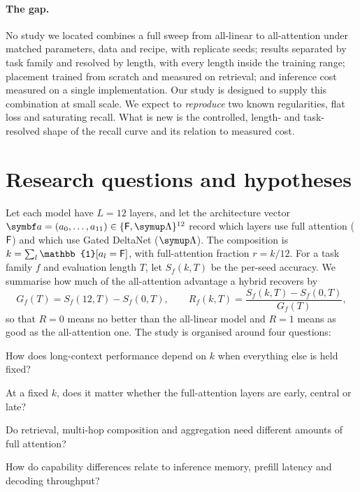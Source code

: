 \documentclass[10pt,a4paper]{article}
\begin{document}
\paragraph{The gap.}
No study we located combines a full sweep from all-linear to all-attention under matched parameters,
data and recipe, with replicate seeds; results separated by task family and resolved by length, with
every length inside the training range; placement trained from scratch and measured on retrieval;
and inference cost measured on a single implementation. Our study is designed to supply this
combination at small scale. We expect to \emph{reproduce} two known regularities, flat loss and
saturating recall. What is new is the controlled, length- and task-resolved shape of the recall
curve and its relation to measured cost.

\section{Research questions and hypotheses}\label{sec:rq}

Let each model have $L=12$ layers, and let the architecture vector
$\vect{a}=(a_0,\dots,a_{11})\in\{\Full,\Lin\}^{12}$ record which layers use full attention ($\mathsf{F}$)
and which use Gated DeltaNet ($\Lin$). The composition is $k=\sum_l\mathbb{1}[a_l=\Full]$, with
full-attention fraction $r=k/12$. For a task family $f$ and evaluation length $T$, let
$S_f(k,T)$ be the per-seed accuracy. We summarise how much of the all-attention advantage a hybrid
recovers by
\begin{equation}\label{eq:recovery}
  G_f(T) = S_f(12,T)-S_f(0,T),\qquad
  R_f(k,T) = \frac{S_f(k,T)-S_f(0,T)}{G_f(T)},
\end{equation}
so that $R=0$ means no better than the all-linear model and $R=1$ means as good as the all-attention
one. The study is organised around four questions:
\begin{description}[leftmargin=1.2em,style=unboxed,itemsep=2pt,font=\normalfont\bfseries]
\item[RQ-A Composition.] How does long-context performance depend on $k$ when everything else is held fixed?
\item[RQ-B Placement.] At a fixed $k$, does it matter whether the full-attention layers are early, central or late?
\item[RQ-C Task dependence.] Do retrieval, multi-hop composition and aggregation need different amounts of full attention?
\item[RQ-D Cost.] How do capability differences relate to inference memory, prefill latency and decoding throughput?
\end{description}
\end{document}
